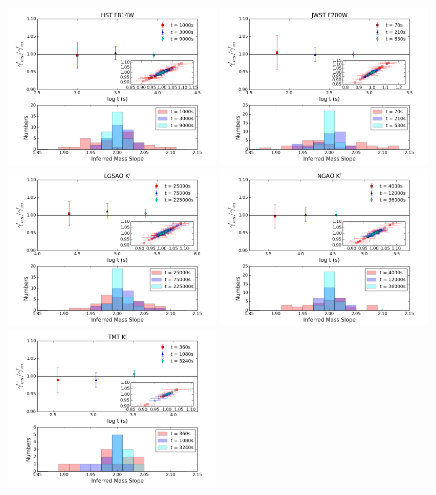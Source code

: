 \documentclass[a4paper,11pt]{article}
\begin{document}
\begin{figure}
\begin{center}
\includegraphics[width=0.49\textwidth]{figures/gamma_hist_135949_4QSO_HST.png}
\includegraphics[width=0.49\textwidth]{figures/gamma_hist_135949_4QSO_JWST.png} \\
\includegraphics[width=0.49\textwidth]{figures/gamma_hist_135949_4QSO_Keck.png}
\includegraphics[width=0.49\textwidth]{figures/gamma_hist_135949_4QSO_NGAO.png} \\
\includegraphics[width=0.49\textwidth]{figures/gamma_hist_135949_4QSO_TMT.png}

\end{center}
\end{figure}
\end{document}

